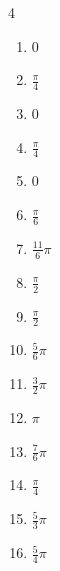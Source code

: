 \begin{multicols}{4}
\begin{enumerate}
  \item $\displaystyle 0$

  \item $\displaystyle \frac{\pi}{4}$

  \item $\displaystyle 0$

  \item $\displaystyle \frac{\pi}{4}$

  \item $\displaystyle 0$

  \item $\displaystyle \frac{\pi}{6}$

  \item $\displaystyle \frac{11}{6}\pi$

  \item $\displaystyle \frac{\pi}{2}$

  \item $\displaystyle \frac{\pi}{2}$

\columnbreak %

\resetques

  \item $\displaystyle \frac{5}{6}\pi$

  \item $\displaystyle \frac{3}{2}\pi$

  \item $\displaystyle \pi$

  \item $\displaystyle \frac{7}{6}\pi$

  \item $\displaystyle \frac{\pi}{4}$

  \item $\displaystyle \frac{5}{3}\pi$

  \item $\displaystyle \frac{5}{4}\pi$


\end{enumerate}
\end{multicols}
